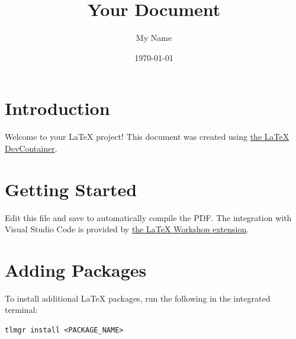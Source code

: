 \documentclass{article}
\title{Your Document}
\author{My Name}
\date{\today}
\begin{document}
\maketitle

\section{Introduction}

Welcome to your LaTeX project! This document was created using \href{https://github.com/gzurowski/latex-devcontainer}{the LaTeX DevContainer}.

\section{Getting Started}

Edit this file and save to automatically compile the PDF.
The integration with Visual Studio Code is provided by \href{https://github.com/James-Yu/LaTeX-Workshop}{the LaTeX Workshop extension}.

\section{Adding Packages}

To install additional LaTeX packages, run the following in the integrated terminal:

\begin{verbatim}
tlmgr install <PACKAGE_NAME>
\end{verbatim}
\end{document}
